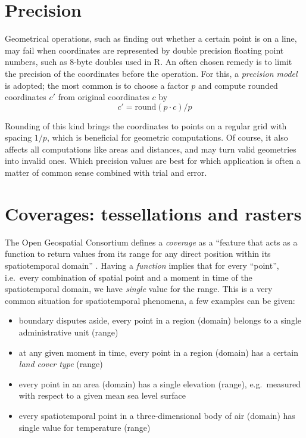 \documentclass[]{book}
\providecommand{\tightlist}{%
  \setlength{\itemsep}{0pt}\setlength{\parskip}{0pt}}
\begin{document}
\hypertarget{precision}{%
\section{Precision}\label{precision}}

Geometrical operations, such as finding out whether a certain
point is on a line, may fail when coordinates are represented by
double precision floating point numbers, such as 8-byte doubles
used in R. An often chosen remedy is to limit the precision of the
coordinates before the operation. For this, a \emph{precision model}
is adopted; the most common is to choose a factor \(p\) and compute
rounded coordinates \(c'\) from original coordinates \(c\) by
\[c' = \mbox{round}(p \cdot c) / p\]

Rounding of this kind brings the coordinates to points on a
regular grid with spacing \(1/p\), which is beneficial for geometric
computations. Of course, it also affects all computations like
areas and distances, and may turn valid geometries into invalid
ones. Which precision values are best for which application is
often a matter of common sense combined with trial and error.

\hypertarget{coverages}{%
\section{Coverages: tessellations and rasters}\label{coverages}}

The Open Geospatial Consortium defines a \emph{coverage} as a ``feature
that acts as a function to return values from its range for any
direct position within its spatiotemporal domain'' \citep{ogccov}. Having
a \emph{function} implies that for every ``point'', i.e.~every combination
of spatial point and a moment in time of the spatiotemporal domain,
we have \emph{single} value for the range. This is a very common situation
for spatiotemporal phenomena, a few examples can be given:

\begin{itemize}
\tightlist
\item
  boundary disputes aside, every point in a region (domain) belongs to a single administrative unit (range)
\item
  at any given moment in time, every point in a region (domain) has a certain \emph{land cover type} (range)
\item
  every point in an area (domain) has a single elevation (range), e.g.~measured with respect to a given mean sea level surface
\item
  every spatiotemporal point in a three-dimensional body of air (domain) has single value for temperature (range)
\end{itemize}
\end{document}
